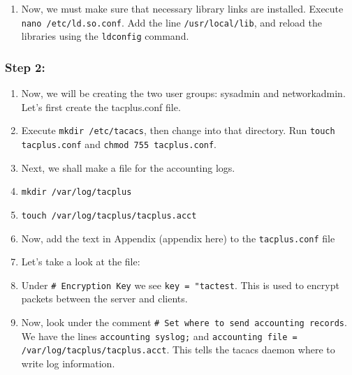 \documentclass[main.tex]{subfiles}
\begin{document}
\begin{itemize}
\begin{enumerate}[noitemsep,label=$\bullet$,leftmargin=20mm,labelsep=0.5cm]
    \item Now, we must make sure that necessary library links are installed. Execute \texttt{nano /etc/ld.so.conf}. Add the line \texttt{/usr/local/lib}, and reload the libraries using the \texttt{ldconfig} command.
    
\end{enumerate}

    \subsubsection{Step 2:  }
    
\begin{enumerate}[noitemsep,label=$\bullet$,leftmargin=20mm,labelsep=0.5cm] 

    \item Now, we will be creating the two user groups: sys\textunderscore admin and network\textunderscore admin. Let's first create the tac\textunderscore plus.conf file.
    
    \item Execute \texttt{mkdir /etc/tacacs}, then change into that directory. Run \texttt{touch tac\textunderscore plus.conf} and \texttt{chmod 755 tac\textunderscore plus.conf}.
    
    \item Next, we shall make a file for the accounting logs. 
    \item \texttt{mkdir /var/log/tac\textunderscore plus}
    \item \texttt{touch /var/log/tac\textunderscore plus/tac\textunderscore plus.acct}
    
    \item Now, add the text in Appendix (appendix here) to the \texttt{tac\textunderscore plus.conf} file 
    
    \item Let's take a look at the file:
     
    \item Under \texttt{# Encryption Key} we see \texttt{key = "tac\textunderscore test}. This is used to encrypt packets between the server and clients.
    
    \item Now, look under the comment \texttt{# Set where to send accounting records}. We have the lines \texttt{accounting syslog;} and \texttt{accounting file = /var/log/tac\textunderscore plus/tac\textunderscore plus.acct}. This tells the tacacs daemon where to write log information.
    

\end{enumerate}
\end{itemize}
\end{document}
